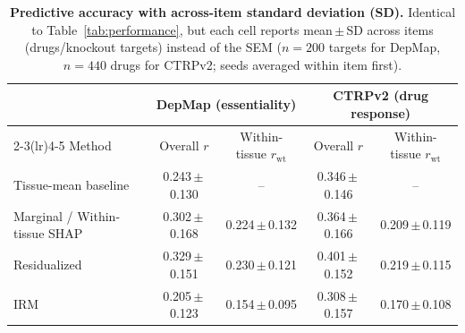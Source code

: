 \begin{table}[t]
  \centering
  \small
  \begin{tabular}{l cc cc}
    \toprule
    & \multicolumn{2}{c}{DepMap (essentiality)} & \multicolumn{2}{c}{CTRPv2 (drug response)} \\
    \cmidrule(lr){2-3}\cmidrule(lr){4-5}
    Method & Overall $r$ & Within-tissue $r_{\mathrm{wt}}$ & Overall $r$ & Within-tissue $r_{\mathrm{wt}}$ \\
    \midrule
    Tissue-mean baseline & 0.243\,$\pm$\,0.130 & -- & 0.346\,$\pm$\,0.146 & -- \\
    \midrule
    Marginal / Within-tissue SHAP & 0.302\,$\pm$\,0.168 & 0.224\,$\pm$\,0.132 & 0.364\,$\pm$\,0.166 & 0.209\,$\pm$\,0.119 \\
    Residualized & 0.329\,$\pm$\,0.151 & 0.230\,$\pm$\,0.121 & 0.401\,$\pm$\,0.152 & 0.219\,$\pm$\,0.115 \\
    IRM & 0.205\,$\pm$\,0.123 & 0.154\,$\pm$\,0.095 & 0.308\,$\pm$\,0.157 & 0.170\,$\pm$\,0.108 \\
    \bottomrule
  \end{tabular}
  \caption{\textbf{Predictive accuracy with across-item standard deviation (SD).} Identical to Table~\ref{tab:performance}, but each cell reports mean\,$\pm$\,SD across items (drugs/knockout targets) instead of the SEM ($n=200$ targets for DepMap, $n=440$ drugs for CTRPv2; seeds averaged within item first).}
  \label{tab:performance_sd}
\end{table}
